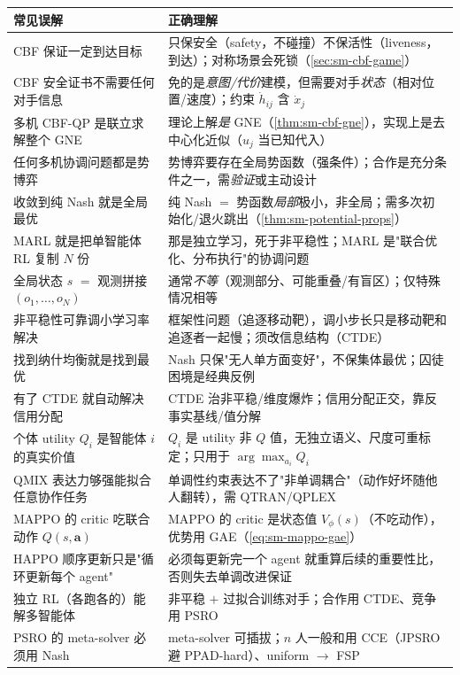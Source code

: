 \begin{table}[H]\centering\small
\begin{tabular}{p{} p{}}
\toprule
\textbf{常见误解} & \textbf{正确理解} \\
\midrule
CBF 保证一定到达目标 & 只保安全（safety，不碰撞）不保活性（liveness，到达）；对称场景会死锁（\cref{sec:sm-cbf-game}）\\
CBF 安全证书不需要任何对手信息 & 免的是\emph{意图/代价}建模，但需要对手\emph{状态}（相对位置/速度）；约束 $\dot h_{ij}$ 含 $\dot x_j$ \\
多机 CBF-QP 是联立求解整个 GNE & 理论上解\emph{是} GNE（\cref{thm:sm-cbf-gne}），实现上是去中心化近似（$u_j$ 当已知代入）\\
任何多机协调问题都是势博弈 & 势博弈要存在全局势函数（强条件）；合作是充分条件之一，需\emph{验证}或主动设计 \\
收敛到纯 Nash 就是全局最优 & 纯 Nash $=$ 势函数\emph{局部}极小，非全局；需多次初始化/退火跳出（\cref{thm:sm-potential-props}）\\
MARL 就是把单智能体 RL 复制 $N$ 份 & 那是独立学习，死于非平稳性；MARL 是"联合优化、分布执行"的协调问题 \\
全局状态 $s$ $=$ 观测拼接 $(o_1,\dots,o_N)$ & 通常\emph{不等}（观测部分、可能重叠/有盲区）；仅特殊情况相等 \\
非平稳性可靠调小学习率解决 & 框架性问题（追逐移动靶），调小步长只是移动靶和追逐者一起慢；须改信息结构（CTDE）\\
找到纳什均衡就是找到最优 & Nash 只保"无人单方面变好"，不保集体最优；囚徒困境是经典反例 \\
有了 CTDE 就自动解决信用分配 & CTDE 治非平稳/维度爆炸；信用分配正交，靠反事实基线/值分解 \\
个体 utility $Q_i$ 是智能体 $i$ 的真实价值 & $Q_i$ 是 utility 非 $Q$ 值，无独立语义、尺度可重标定；只用于 $\arg\max_{a_i}Q_i$ \\
QMIX 表达力够强能拟合任意协作任务 & 单调性约束表达不了"非单调耦合"（动作好坏随他人翻转），需 QTRAN/QPLEX \\
MAPPO 的 critic 吃联合动作 $Q(s,\mathbf{a})$ & MAPPO 的 critic 是状态值 $V_\phi(s)$（不吃动作），优势用 GAE（\cref{eq:sm-mappo-gae}）\\
HAPPO 顺序更新只是"循环更新每个 agent" & 必须每更新完一个 agent 就重算后续的重要性比，否则失去单调改进保证 \\
独立 RL（各跑各的）能解多智能体 & 非平稳 $+$ 过拟合训练对手；合作用 CTDE、竞争用 PSRO \\
PSRO 的 meta-solver 必须用 Nash & meta-solver 可插拔；$n$ 人一般和用 CCE（JPSRO 避 PPAD-hard）、uniform $\to$ FSP \\

\end{tabular}
\end{table}
